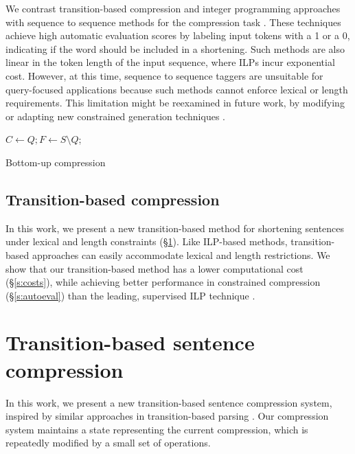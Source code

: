 \documentclass[11pt,a4paper]{article}
\begin{document}
We contrast transition-based compression and integer programming approaches with sequence to sequence methods for the compression task \cite{filippova2015sentence}. These techniques achieve high automatic evaluation scores by labeling input tokens with a 1 or a 0, indicating if the word should be included in a shortening. Such methods are also linear in the token length of the input sequence, where ILPs incur exponential cost. However, at this time, sequence to sequence taggers are unsuitable for query-focused applications because such methods cannot enforce lexical or length requirements. This limitation might be reexamined in future work, by modifying or adapting new constrained generation techniques \cite{N18-1119,aaimh}.


\begin{algorithm}[]
\SetAlgoLined
{}
 $ C \gets Q;  F \gets S \setminus Q$; \\
 \caption{Bottom-up compression}
\end{algorithm}


\subsection{Transition-based compression}

In this work, we present a new transition-based method for shortening sentences under lexical and length constraints (\S\ref{s:system}). Like ILP-based methods, transition-based approaches can easily accommodate lexical and length restrictions. We show that our transition-based method has a lower computational cost (\S\ref{s:costs}), while achieving better performance in constrained compression (\S\ref{s:autoeval}) than the leading, supervised ILP technique \cite{filippova2013overcoming}.

\section{Transition-based sentence compression}\label{s:system}

In this work, we present a new transition-based sentence compression system, inspired by similar approaches in transition-based parsing \cite{nivre2003,D14-1082}. Our compression system maintains a state representing the current compression, which is repeatedly modified by a small set of operations. 
\end{document}
